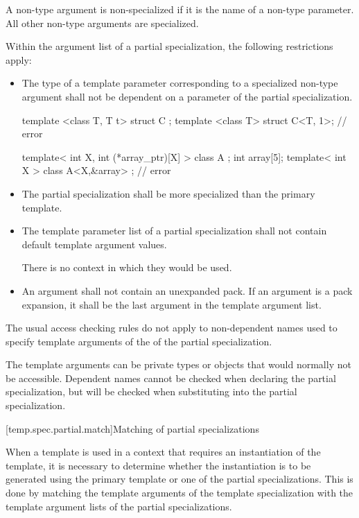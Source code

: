 \pnum
A non-type argument is non-specialized if it is the name of a non-type
parameter.
All other non-type arguments are specialized.

\pnum
Within the argument list of a partial specialization,
the following restrictions apply:

\begin{itemize}
\item
The type of a template parameter corresponding to a specialized non-type argument
shall not be dependent on a parameter of the partial specialization.
\begin{example}
\begin{codeblock}
template <class T, T t> struct C {};
template <class T> struct C<T, 1>;              // error

template< int X, int (*array_ptr)[X] > class A {};
int array[5];
template< int X > class A<X,&array> { };        // error
\end{codeblock}

\end{example}
\item
The partial specialization shall be more specialized than the primary
template.

\item
The template parameter list of a partial specialization shall not contain default
template argument values.
\begin{footnote}
There is no context in which they would be used.
\end{footnote}
\item
An argument shall not contain an unexpanded pack. If
an argument is a pack expansion, it shall be
the last argument in the template argument list.
\end{itemize}

\pnum
The usual access checking rules do not apply to non-dependent names
used to specify template arguments of the 
of the partial specialization.
\begin{note}
The template arguments can be private types or
objects that would normally not be accessible.
Dependent names cannot be checked when declaring the partial specialization,
but will be checked when substituting into the partial specialization.
\end{note}

[temp.spec.partial.match]{Matching of partial specializations}

\pnum
When a template is used in a context that requires an instantiation of
the template,
it is necessary to determine whether the instantiation is to be generated
using the primary template or one of the partial specializations.
This is done by matching the template arguments of the template
specialization with the template argument lists of the partial
specializations.

